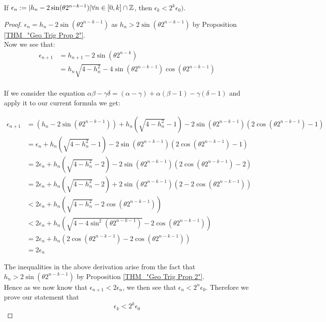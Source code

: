 \begin{Geo Trig Prop 3}
\label{THM_"Geo Trig Prop 3"}
If \(\epsilon_n := |h_n - 2\sin(\theta2^{n-k-1})| \forall n \in [0,k] \cap \mathbb{Z}\), then \(\epsilon_k < 2^k\epsilon_0)\).
\end{Geo Trig Prop 3}
\begin{proof}
\(\epsilon_n = h_n - 2\sin(\theta2^{n-k-1})\) as \(h_n > 2\sin(\theta2^{n-k-1})\) by Proposition \ref{THM_"Geo Trig Prop 2"}.\\

Now we see that:
\begin{displaymath}
\begin{align*}
	\epsilon_{n+1} &= h_{n+1} - 2\sin(\theta2^{n-k})\\
		&= h_n\sqrt{4-h_n^2} 
			- 4\sin(\theta2^{n-k-1})\cos(\theta2^{n-k-1})\\
\end{align*}
\end{displaymath}

If we consider the equation \(\alpha\beta - \gamma\delta = (\alpha - \gamma) + \alpha(\beta - 1) - \gamma(\delta - 1)\) and apply it to our current formula we get:

\begin{displaymath}
\begin{align*}
	\epsilon_{n+1} &= (h_n - 2\sin(\theta2^{n-k-1})) 
						+ h_n(\sqrt{4 - h_n^2} - 1)
						- 2\sin(\theta2^{n-k-1})(2\cos(\theta2^{n-k-1}) - 1)\\
		&= \epsilon_n + h_n(\sqrt{4 - h_n^2} - 1)
			-2\sin(\theta2^{n-k-1})(2\cos(\theta2^{n-k-1}) - 1)\\
		&= 2\epsilon_n + h_n(\sqrt{4 - h_n^2} - 2)
			-2\sin(\theta2^{n-k-1})(2\cos(\theta2^{n-k-1}) - 2)\\
		&= 2\epsilon_n + h_n(\sqrt{4 - h_n^2} - 2)
			+2\sin(\theta2^{n-k-1})(2 - 2\cos(\theta2^{n-k-1}))\\
		&< 2\epsilon_n + h_n(\sqrt{4 - h_n^2} - 2\cos(\theta2^{n-k-1}))\\
		&< 2\epsilon_n + h_n(\sqrt{4 - 4\sin^2(\theta2^{n-k-1})}
			- 2\cos(\theta2^{n-k-1}))\\
		&= 2\epsilon_n + h_n(2\cos(\theta2^{n-k-1}) 
			- 2\cos(\theta2^{n-k-1}))\\
		&= 2\epsilon_n
\end{align*}
\end{displaymath}

The inequalities in the above derivation arise from the fact that \(h_n > 2\sin(\theta2^{n-k-1})\) by Proposition \ref{THM_"Geo Trig Prop 2"}.\\

Hence as we now know that \(\epsilon_{n+1} < 2\epsilon_n\), we then see that \(\epsilon_n < 2^n\epsilon_0\). Therefore we prove our statement that
\[\epsilon_k < 2^k\epsilon_0\]
\end{proof}


